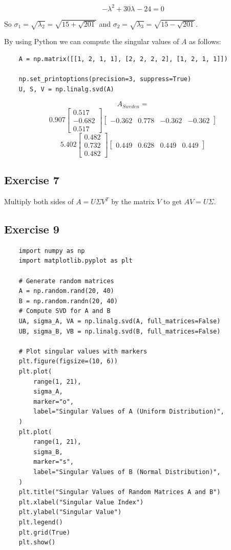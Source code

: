 \documentclass{article}
\begin{document}
\[
    -\lambda^{2} + 30 \lambda^{} - 24 = 0
\]

So $\sigma_{1} = \sqrt{\lambda_{2}} = \sqrt{15 + \sqrt{201}}$ and $\sigma_{2} = \sqrt{\lambda_{3}} = \sqrt{15 - \sqrt{201}}$.

By using Python we can compute the singular values of $A$ as follows:
\begin{verbatim}
    A = np.matrix([[1, 2, 1, 1], [2, 2, 2, 2], [1, 2, 1, 1]])

    np.set_printoptions(precision=3, suppress=True)
    U, S, V = np.linalg.svd(A)
\end{verbatim}

\[
    A_{Sweden} =
\]
\[
    0.907
    \begin{bmatrix}
        0.517  \\
        -0.682 \\
        0.517
    \end{bmatrix}
    \begin{bmatrix}
        -0.362 & 0.778 & -0.362 & -0.362
    \end{bmatrix}\]
\[
    5.402
    \begin{bmatrix}
        0.482 \\
        0.732 \\
        0.482
    \end{bmatrix}
    \begin{bmatrix}
        0.449 & 0.628 & 0.449 & 0.449
    \end{bmatrix}
\]

\subsection{Exercise 7}
Multiply both sides of $A = U \Sigma V^{T}$ by the matrix $V$ to get $AV = U \Sigma$.

\subsection{Exercise 9}
\begin{verbatim}
    import numpy as np
    import matplotlib.pyplot as plt

    # Generate random matrices
    A = np.random.rand(20, 40)
    B = np.random.randn(20, 40)
    # Compute SVD for A and B
    UA, sigma_A, VA = np.linalg.svd(A, full_matrices=False)
    UB, sigma_B, VB = np.linalg.svd(B, full_matrices=False)

    # Plot singular values with markers
    plt.figure(figsize=(10, 6))
    plt.plot(
        range(1, 21),
        sigma_A,
        marker="o",
        label="Singular Values of A (Uniform Distribution)",
    )
    plt.plot(
        range(1, 21),
        sigma_B,
        marker="s",
        label="Singular Values of B (Normal Distribution)",
    )
    plt.title("Singular Values of Random Matrices A and B")
    plt.xlabel("Singular Value Index")
    plt.ylabel("Singular Value")
    plt.legend()
    plt.grid(True)
    plt.show()
\end{verbatim}
\end{document}
